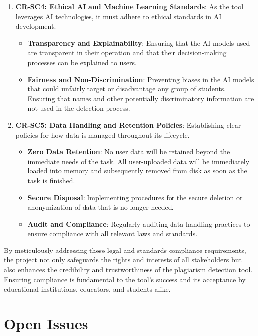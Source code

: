 \documentclass[12pt]{article}
\begin{document}
\begin{enumerate}
    \item \textbf{CR-SC4: Ethical AI and Machine Learning Standards}: As the tool leverages AI
    technologies, it must adhere to ethical standards in AI development.
    \begin{itemize}
        \item \textbf{Transparency and Explainability}: Ensuring that the AI models used
        are transparent in their operation and that their decision-making processes can be
        explained to users.
        \item \textbf{Fairness and Non-Discrimination}: Preventing biases in the AI models
        that could unfairly target or disadvantage any group of students. Ensuring that names
        and other potentially discriminatory information are not used in the detection process.
    \end{itemize}

    \item \textbf{CR-SC5: Data Handling and Retention Policies}: Establishing clear policies for
    how data is managed throughout its lifecycle.
    \begin{itemize}
        \item \textbf{Zero Data Retention}: No user data will be retained beyond the immediate needs of the task.
        All user-uploaded data will be immediately loaded into memory and subsequently removed from disk as soon
        as the task is finished.
        \item \textbf{Secure Disposal}: Implementing procedures for the secure deletion or
        anonymization of data that is no longer needed.
        \item \textbf{Audit and Compliance}: Regularly auditing data handling practices to
        ensure compliance with all relevant laws and standards.
    \end{itemize}
\end{enumerate}

By meticulously addressing these legal and standards compliance requirements, the
project not only safeguards the rights and interests of all stakeholders but also
enhances the credibility and trustworthiness of the plagiarism detection tool. Ensuring
compliance is fundamental to the tool's success and its acceptance by educational
institutions, educators, and students alike.


\section{Open Issues}
\end{document}

